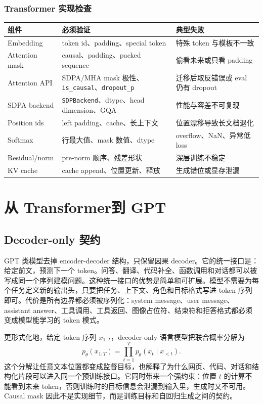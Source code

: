 \documentclass[UTF8,zihao=-4,openany]{ctexbook}
\newcommand{\Transformer}{Transformer}
\begin{document}
\subsection{Transformer 实现检查}
\begin{center}
\begin{tabular}{p{}p{}p{}}
\toprule
组件 & 必须验证 & 典型失败 \\
\midrule
Embedding & token id、padding、special token & 特殊 token 与模板不一致 \\
Attention mask & causal、padding、packed sequence & 偷看未来或只看 padding \\
Attention API & SDPA/MHA mask 极性、\texttt{is\_causal}、\texttt{dropout\_p} & 迁移后取反错误或 eval 仍有 dropout \\
SDPA backend & \texttt{SDPBackend}、dtype、head dimension、GQA & 性能与容差不可复现 \\
Position ids & left padding、cache、长上下文 & 位置漂移导致长文档退化 \\
Softmax & 行最大值、mask 数值、dtype & overflow、NaN、异常低 loss \\
Residual/norm & pre-norm 顺序、残差形状 & 深层训练不稳定 \\
KV cache & cache append、位置更新、释放 & 生成错位或显存泄漏 \\
\bottomrule
\end{tabular}
\end{center}

\chapter{从 \Transformer 到 GPT}
\section{Decoder-only 契约}
GPT 类模型去掉 encoder-decoder 结构，只保留因果 decoder。它的统一接口是：给定前文，预测下一个 token。问答、翻译、代码补全、函数调用和对话都可以被写成同一个序列建模问题。这种统一接口的优势是简单和可扩展。模型不需要为每个任务定义新的输出头，只要把任务、上下文、角色和目标格式写进 token 序列即可。代价是所有边界都必须被序列化：system message、user message、assistant answer、工具调用、工具返回、图像占位符、结束符和拒答格式都必须变成模型能学习的 token 模式。

更形式化地，给定 token 序列 $x_{1:T}$，decoder-only 语言模型把联合概率分解为
\[
  p_{\theta}(x_{1:T})=\prod_{t=1}^{T}p_{\theta}(x_t\mid x_{<t}) .
\]
这个分解让任意文本位置都变成监督目标，也解释了为什么网页、代码、对话和结构化片段可以进入同一个预训练接口。它同时带来一个强约束：位置 $t$ 的计算不能看到未来 token，否则训练时的目标信息会泄漏到输入里，生成时又不可用。Causal mask 因此不是实现细节，而是训练目标和自回归生成之间的契约。
\end{document}
